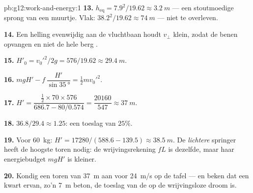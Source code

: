 \begin{solution}{pb:g12:work-and-energy:1}
\textbf{13.} $h_{\text{eq}} = 7.9^2/19.62 \approx \qty{3.2}{m}$ --- een
stoutmoedige sprong van een muurtje. Vlak: $38.2^2/19.62 \approx \qty{74}{m}$
--- niet te overleven.

\textbf{14.} Een helling evenwijdig aan de vluchtbaan houdt $v_\perp$ klein,
zodat de benen  opvangen en niet de hele berg .

\textbf{15.} $H'_0 = v_0'^2/2g = 576/19.62 \approx \qty{29.4}{m}$.

\textbf{16.} $mgH' - f\,\dfrac{H'}{\sin\qty{35}{\degree}} =
\tfrac12 m v_0'^2$.

\textbf{17.} $H' = \dfrac{\tfrac12 \times 70 \times 576}
{686.7 - 80/0.574} = \dfrac{\num{20160}}{547} \approx \qty{37}{m}$.

\textbf{18.} $36.8/29.4 \approx 1.25$: een toeslag van $25\%$.

\textbf{19.} Voor \qty{60}{kg}: $H' = \num{17280}/(588.6 - 139.5)
\approx \qty{38.5}{m}$. De \emph{lichtere} springer heeft de hoogste toren
nodig: de wrijvingsrekening $fL$ is dezelfde, maar haar energiebudget $mgH'$
is kleiner.

\textbf{20.} Kondig een toren van \qty{37}{m} aan voor \qty{24}{m/s} op de
tafel --- en beken dat een kwart ervan, zo'n \qty{7}{m} beton, de toeslag van
de  op de wrijvingsloze droom is.
\end{solution}
